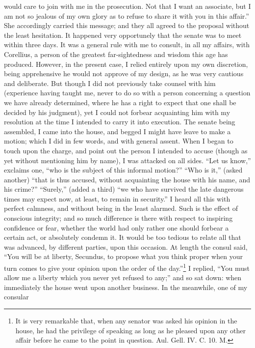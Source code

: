 would care to join with me in the prosecution. Not that I want an
associate, but I am not so jealous of my own glory as to refuse to share
it with you in this affair.'' She accordingly carried this message; and
they all agreed to the proposal without the least hesitation. It happened
very opportunely that the senate was to meet within three days. It was a
general rule with me to consult, in all my affairs, with Corellius, a
person of the greatest far-sightedness and wisdom this age has produced.
However, in the present case, I relied entirely upon my own discretion,
being apprehensive he would not approve of my design, as he was very
cautious and deliberate. But though I did not previously take counsel with
him (experience having taught me, never to do so with a person concerning
a question we have already determined, where he has a right to expect that
one shall be decided by his judgment), yet I could not forbear acquainting
him with my resolution at the time I intended to carry it into execution.
The senate being assembled, I came into the house, and begged I might have
leave to make a motion; which I did in few words, and with general assent.
When I began to touch upon the charge, and point out the person I intended
to accuse (though as yet without mentioning him by name), I was attacked
on all sides. ``Let us know,'' exclaims one, ``who is the subject of this
informal motion?'' ``Who is it,'' (asked another) ``that is thus accused,
without acquainting the house with his name, and his crime?'' ``Surely,''
(added a third) ``we who have survived the late dangerous times may expect
now, at least, to remain in security.'' I heard all this with perfect
calmness, and without being in the least alarmed. Such is the effect of
conscious integrity; and so much difference is there with respect to
inspiring confidence or fear, whether the world had only rather one should
forbear a certain act, or absolutely condemn it. It would be too tedious
to relate all that was advanced, by different parties, upon this occasion.
At length the consul said, ``You will be at liberty, Secundus, to propose
what you think proper when your turn comes to give your opinion upon the
order of the day.''\footnote{It is very remarkable
that, when any senator was asked his opinion in the house, he had the
privilege of speaking as long as he pleased upon any other affair before
he came to the point in question. Aul. Gell. IV. C. 10. M.} I replied, ``You must allow me a liberty
which you never yet refused to any;'' and so sat down: when immediately the
house went upon another business. In the meanwhile, one of my consular
